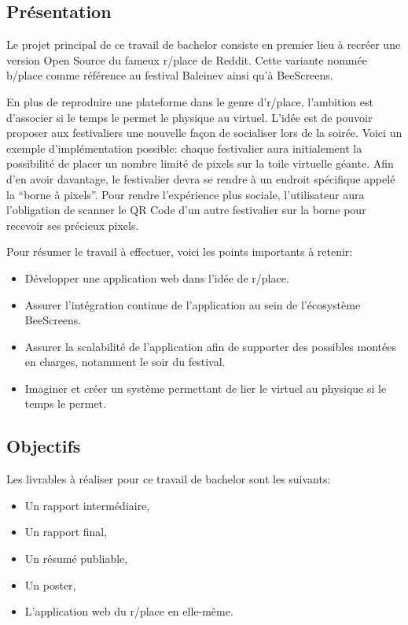 \subsection{Présentation}

Le projet principal de ce travail de bachelor consiste en premier lieu à recréer une version Open Source du fameux r/place de Reddit. Cette variante nommée b/place comme référence au festival Baleinev ainsi qu'à BeeScreens.

En plus de reproduire une plateforme dans le genre d'r/place, l'ambition est d'associer si le temps le permet le physique au virtuel. L'idée est de pouvoir proposer aux festivaliers une nouvelle façon de socialiser lors de la soirée. Voici un exemple d'implémentation possible: chaque festivalier aura initialement la possibilité de placer un nombre limité de pixels sur la toile virtuelle géante. Afin d'en avoir davantage, le festivalier devra se rendre à un endroit spécifique appelé la “borne à pixels”. Pour rendre l'expérience plus sociale, l'utilisateur aura l'obligation de scanner le QR Code d'un autre festivalier sur la borne pour recevoir ses précieux pixels.

Pour résumer le travail à effectuer, voici les points importants à retenir:

\begin{itemize}
  \item Développer une application web dans l'idée de r/place.
  \item Assurer l'intégration continue de l'application au sein de l'écosystème BeeScreens.
  \item Assurer la scalabilité de l'application afin de supporter des possibles montées en charges, notamment le soir du festival.
  \item Imaginer et créer un système permettant de lier le virtuel au physique si le temps le permet.
\end{itemize}

\subsection{Objectifs}

Les livrables à réaliser pour ce travail de bachelor sont les suivants:

\begin{itemize}
  \item Un rapport intermédiaire,
  \item Un rapport final,
  \item Un résumé publiable,
  \item Un poster,
  \item L'application web du r/place en elle-même.
\end{itemize}

